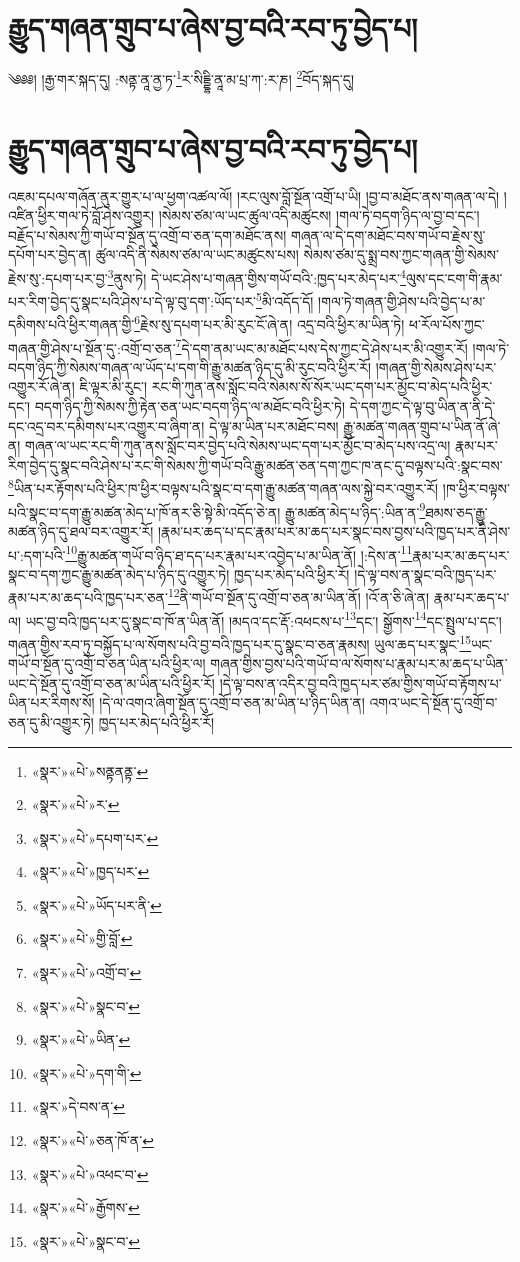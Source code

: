 \chapter{རྒྱུད་གཞན་གྲུབ་པ་ཞེས་བྱ་བའི་རབ་ཏུ་བྱེད་པ།}༄༅༅། །རྒྱ་གར་སྐད་དུ། :སནྟ་ནཱ་ནྱ་ཏ་\footnote{«སྣར་»«པེ་»སནྟནནྟ་}ར་སིདྡྷི་ནཱ་མ་པྲ་ཀ་:ར་ཎ། \footnote{«སྣར་»«པེ་»ར་}བོད་སྐད་དུ། \chapter{རྒྱུད་གཞན་གྲུབ་པ་ཞེས་བྱ་བའི་རབ་ཏུ་བྱེད་པ།} འཇམ་དཔལ་གཞོན་ནུར་གྱུར་པ་ལ་ཕྱག་འཚལ་ལོ། །རང་ལུས་བློ་སྔོན་འགྲོ་པ་ཡི། །བྱ་བ་མཐོང་ནས་གཞན་ལ་དེ། །འཛིན་ཕྱིར་གལ་ཏེ་བློ་ཤེས་འགྱུར། །སེམས་ཙམ་ལ་ཡང་ཚུལ་འདི་མཚུངས། །གལ་ཏེ་བདག་ཉིད་ལ་བྱ་བ་དང་། བརྗོད་པ་སེམས་ཀྱི་གཡོ་བ་སྔོན་དུ་འགྲོ་བ་ཅན་དག་མཐོང་ནས། གཞན་ལ་དེ་དག་མཐོང་བས་གཡོ་བ་རྗེས་སུ་དཔོག་པར་བྱེད་ན། ཚུལ་འདི་ནི་སེམས་ཙམ་ལ་ཡང་མཚུངས་པས། སེམས་ཙམ་དུ་སྨྲ་བས་ཀྱང་གཞན་གྱི་སེམས་རྗེས་སུ་:དཔག་པར་བྱ་\footnote{«སྣར་»«པེ་»དཔག་པར་}ནུས་ཏེ། དེ་ཡང་ཤེས་པ་གཞན་གྱིས་གཡོ་བའི་:ཁྱད་པར་མེད་པར་\footnote{«སྣར་»«པེ་»ཁྱད་པར་}ལུས་དང་ངག་གི་རྣམ་པར་རིག་བྱེད་དུ་སྣང་པའི་ཤེས་པ་དེ་ལྟ་བུ་དག་:ཡོད་པར་\footnote{«སྣར་»«པེ་»ཡོད་པར་ནི་}མི་འདོད་དོ། །གལ་ཏེ་གཞན་གྱི་ཤེས་པའི་བྱེད་པ་མ་དམིགས་པའི་ཕྱིར་གཞན་གྱི་\footnote{«སྣར་»«པེ་»གྱི་བློ་}རྗེས་སུ་དཔག་པར་མི་རུང་ངོ་ཞེ་ན། འདྲ་བའི་ཕྱིར་མ་ཡིན་ཏེ། ཕ་རོལ་པོས་ཀྱང་གཞན་གྱི་ཤེས་པ་སྔོན་དུ་:འགྲོ་བ་ཅན་\footnote{«སྣར་»«པེ་»འགྲོ་བ་}དེ་དག་ནམ་ཡང་མ་མཐོང་པས་དེས་ཀྱང་དེ་ཤེས་པར་མི་འགྱུར་རོ། །གལ་ཏེ་བདག་ཉིད་ཀྱི་སེམས་གཞན་ལ་ཡོད་པ་དག་གི་རྒྱུ་མཚན་ཉིད་དུ་མི་རུང་བའི་ཕྱིར་རོ། །གཞན་གྱི་སེམས་ཤེས་པར་འགྱུར་རོ་ཞེ་ན། ཇི་ལྟར་མི་རུང་། རང་གི་ཀུན་ནས་སློང་བའི་སེམས་སོ་སོར་ཡང་དག་པར་མྱོང་བ་མེད་པའི་ཕྱིར་དང་། བདག་ཉིད་ཀྱི་སེམས་ཀྱི་རྟེན་ཅན་ཡང་བདག་ཉིད་ལ་མཐོང་བའི་ཕྱིར་ཏེ། དེ་དག་ཀྱང་དེ་ལྟ་བུ་ཡིན་ན་ནི་དེ་དང་འདྲ་བར་དམིགས་པར་འགྱུར་བ་ཞིག་ན། དེ་ལྟ་མ་ཡིན་པར་མཐོང་བས། རྒྱུ་མཚན་གཞན་གྲུབ་པ་ཡིན་ནོ་ཞེ་ན། གཞན་ལ་ཡང་རང་གི་ཀུན་ནས་སློང་བར་བྱེད་པའི་སེམས་ཡང་དག་པར་མྱོང་བ་མེད་པས་འདྲ་ལ། རྣམ་པར་རིག་བྱེད་དུ་སྣང་བའི་ཤེས་པ་རང་གི་སེམས་ཀྱི་གཡོ་བའི་རྒྱུ་མཚན་ཅན་དག་ཀྱང་ཁ་ནང་དུ་བལྟས་པའི་:སྣང་བས་\footnote{«སྣར་»«པེ་»སྣང་བ་}ཡིན་པར་རྟོགས་པའི་ཕྱིར་ཁ་ཕྱིར་བལྟས་པའི་སྣང་བ་དག་རྒྱུ་མཚན་གཞན་ལས་སྐྱེ་བར་འགྱུར་རོ། །ཁ་ཕྱིར་བལྟས་པའི་སྣང་བ་དག་རྒྱུ་མཚན་མེད་པ་ཁོ་ནར་ཅི་སྟེ་མི་འདོད་ཅེ་ན། རྒྱུ་མཚན་མེད་པ་ཉིད་:ཡིན་ན་\footnote{«སྣར་»«པེ་»ཡིན་}ཐམས་ཅད་རྒྱུ་མཚན་ཉིད་དུ་ཐལ་བར་འགྱུར་རོ། །རྣམ་པར་ཆད་པ་དང་རྣམ་པར་མ་ཆད་པར་སྣང་བས་བྱས་པའི་ཁྱད་པར་ནི་ཤེས་པ་:དག་པའི་\footnote{«སྣར་»«པེ་»དག་གི་}རྒྱུ་མཚན་གཡོ་བ་ཉིད་ཐ་དད་པར་རྣམ་པར་འབྱེད་པ་མ་ཡིན་ནོ། །:དེས་ན་\footnote{«སྣར་»དེ་བས་ན་}རྣམ་པར་མ་ཆད་པར་སྣང་བ་དག་ཀྱང་རྒྱུ་མཚན་མེད་པ་ཉིད་དུ་འགྱུར་ཏེ། ཁྱད་པར་མེད་པའི་ཕྱིར་རོ། །དེ་ལྟ་བས་ན་སྣང་བའི་ཁྱད་པར་རྣམ་པར་མ་ཆད་པའི་ཁྱད་པར་ཅན་\footnote{«སྣར་»«པེ་»ཅན་ཁོ་ན་}ནི་གཡོ་བ་སྔོན་དུ་འགྲོ་བ་ཅན་མ་ཡིན་ནོ། །འོ་ན་ཅི་ཞེ་ན། རྣམ་པར་ཆད་པ་ལ། ཡང་བྱ་བའི་ཁྱད་པར་དུ་སྣང་བ་ཁོ་ན་ཡིན་ནོ། །མདའ་དང་རྡོ་:འཕངས་པ་\footnote{«སྣར་»«པེ་»འཕང་བ་}དང་། སྒྱོགས་\footnote{«སྣར་»«པེ་»རྒྱོགས་}དང་སྤྲུལ་པ་དང་། གཞན་གྱིས་རབ་ཏུ་བསྐྱོད་པ་ལ་སོགས་པའི་བྱ་བའི་ཁྱད་པར་དུ་སྣང་བ་ཅན་རྣམས། ཡུལ་ཆད་པར་སྣང་\footnote{«སྣར་»«པེ་»སྣང་བ་}ཡང་གཡོ་བ་སྔོན་དུ་འགྲོ་བ་ཅན་ཡིན་པའི་ཕྱིར་ལ། གཞན་གྱིས་བྱས་པའི་གཡོ་བ་ལ་སོགས་པ་རྣམ་པར་མ་ཆད་པ་ཡིན་ཡང་དེ་སྔོན་དུ་འགྲོ་བ་ཅན་མ་ཡིན་པའི་ཕྱིར་རོ། །དེ་ལྟ་བས་ན་འདིར་བྱ་བའི་ཁྱད་པར་ཙམ་གྱིས་གཡོ་བ་རྟོགས་པ་ཡིན་པར་རིགས་སོ། །དེ་ལ་འགའ་ཞིག་སྔོན་དུ་འགྲོ་བ་ཅན་མ་ཡིན་པ་ཉིད་ཡིན་ན། འགའ་ཡང་དེ་སྔོན་དུ་འགྲོ་བ་ཅན་དུ་མི་འགྱུར་ཏེ། ཁྱད་པར་མེད་པའི་ཕྱིར་རོ། 